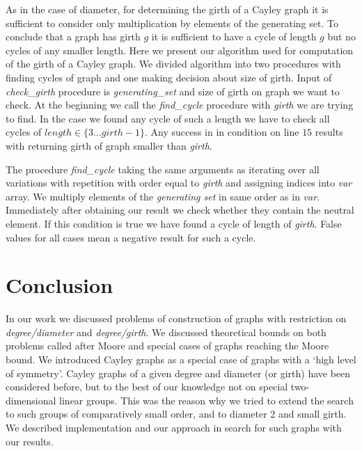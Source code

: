 \documentclass[a4paper,12pt,oneside]{report}%
\begin{document}
As in the case of diameter, for determining the girth of a Cayley graph it is sufficient to consider only multiplication by elements of the generating set.
To conclude that a graph has girth $g$ it is sufficient to have a cycle of length $g$ but no cycles of any smaller length.
Here we present our algorithm used for computation of the girth of a Cayley graph. We divided algorithm into two procedures with finding cycles of graph and one making decision about size of girth.
Input of {\em check\_girth} procedure is {\em generating\_set} and size of girth on graph we want to check.
At the beginning we call the {\em find\_cycle} procedure with {\em girth} we are trying to find. In the case we found any cycle of such a length we have to check all cycles of $length \in \{3 \dots girth - 1\}$. Any success in in condition on line $15$ results with returning girth of graph smaller than {\em girth}. 

The procedure {\em find\_cycle} taking the same arguments as  iterating over all variations with repetition with order equal to {\em girth} and assigning indices into {\em var} array. We multiply elements of the {\em generating set} in same order as in {\em var}. Immediately after obtaining our result we check whether they contain the neutral element. If this condition is true we have found a cycle of length of {\em girth}. False values for  all cases mean a negative result for such a cycle.

\newpage


\newpage

\section{Conclusion}

In our work we discussed problems of construction of graphs with restriction on {\em degree/diameter} and {\em degree/girth}. We discussed theoretical bounds on both problems called after Moore and special cases of graphs reaching the Moore bound. We introduced Cayley graphs as a special case of graphs with a `high level of symmetry'. Cayley graphs of a given degree and diameter (or girth) have been considered before, but to the best of our knowledge not on special two-dimensional linear groups. This was the reason why we tried to extend the search to such groups of comparatively small order, and to diameter 2 and small girth. We described implementation and our approach in search for such graphs with our results.
\end{document}
